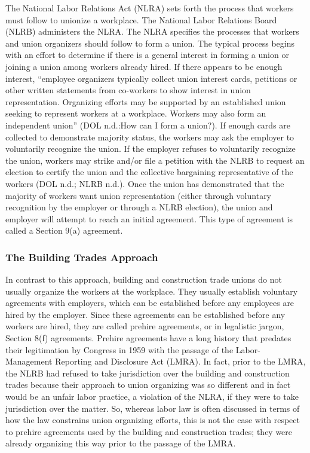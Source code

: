 The National Labor Relations Act (NLRA) sets forth the process that workers must follow to unionize a workplace. The National Labor Relations Board (NLRB) administers the NLRA. The NLRA specifies the processes that workers and union organizers should follow to form a union. The typical process begins with an effort to determine if there is a general interest in forming a union or joining a union among workers already hired. If there appears to be enough interest, “employee organizers typically collect union interest cards, petitions or other written statements from co-workers to show interest in union representation. Organizing efforts may be supported by an established union seeking to represent workers at a workplace. Workers may also form an independent union” (DOL n.d.:How can I form a union?). If enough cards are collected to demonstrate majority status, the workers may ask the employer to voluntarily recognize the union. If the employer refuses to voluntarily recognize the union, workers may strike and/or file a petition with the NLRB to request an election to certify the union and the collective bargaining representative of the workers (DOL n.d.; NLRB n.d.). Once the union has demonstrated that the majority of workers want union representation (either through voluntary recognition by the employer or through a NLRB election), the union and employer will attempt to reach an initial agreement. This type of agreement is called a Section 9(a) agreement.

\subsubsection{The Building Trades Approach}

In contrast to this approach, building and construction trade unions do not usually organize the workers at the workplace. They usually establish voluntary agreements with employers, which can be established before any employees are hired by the employer. Since these agreements can be established before any workers are hired, they are called prehire agreements, or in legalistic jargon, Section 8(f) agreements. Prehire agreements have a long history that predates their legitimation by Congress in 1959 with the passage of the Labor-Management Reporting and Disclosure Act (LMRA). In fact, prior to the LMRA, the NLRB had refused to take jurisdiction over the building and construction trades because their approach to union organizing was so different and in fact would be an unfair labor practice, a violation of the NLRA, if they were to take jurisdiction over the matter. So, whereas labor law is often discussed in terms of how the law constrains union organizing efforts, this is not the case with respect to prehire agreements used by the building and construction trades; they were already organizing this way prior to the passage of the LMRA.

